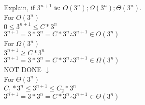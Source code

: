 \documentclass[12pt,largemargins]{homework}
\date{September 6, 2018}
\begin{document}
\maketitle
\question
Explain, if $3^{n + 1}$ is: $ O(3^n ) ; \Omega ( 3^n ) ; \Theta ( 3^n ) $.\\
For $O(3^n)$\\
$ 0\leq 3^{n+1} \leq C*3^n$\\
$3^{n+1} = 3*3^n = C * 3^n \therefore 3^{n+1} \in O(3^n)$\\
For $\Omega (3^n)$\\
$3^{n+1} \geq C*3^n$\\
$3^{n+1} = 3*3^n = C * 3^n \therefore 3^{n+1} \in \Omega(3^n)$\\
NOT DONE $\downarrow$\\
For $\Theta (3^n)$\\
$C_1 * 3^n \leq 3^{n+1} \leq C_2*3^n$\\
$3^{n+1} = 3*3^n = C * 3^n \therefore 3^{n+1} \in \Theta(3^n)$\\
\end{document}
